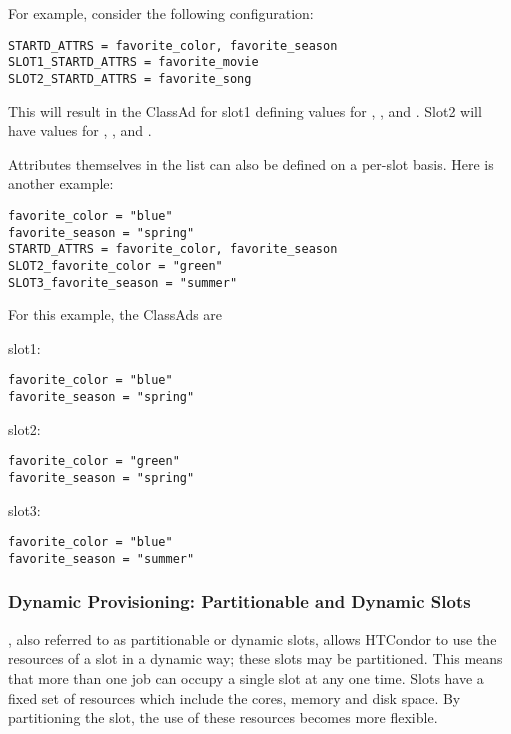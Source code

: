For example, consider the following configuration:
\begin{verbatim}
STARTD_ATTRS = favorite_color, favorite_season
SLOT1_STARTD_ATTRS = favorite_movie
SLOT2_STARTD_ATTRS = favorite_song
\end{verbatim}

This will result in the  ClassAd for
slot1 defining values for
, ,
and .
Slot2 will have values for
, , and .

Attributes themselves in the  list
can also be defined on a per-slot basis.
Here is another example:

\begin{verbatim}
favorite_color = "blue"
favorite_season = "spring"
STARTD_ATTRS = favorite_color, favorite_season
SLOT2_favorite_color = "green"
SLOT3_favorite_season = "summer"
\end{verbatim}

For this example, the  ClassAds are
\begin{description}
\item{slot1}:
\begin{verbatim}
favorite_color = "blue"
favorite_season = "spring"
\end{verbatim}
\item{slot2}:
\begin{verbatim}
favorite_color = "green"
favorite_season = "spring"
\end{verbatim}
\item{slot3}:
\begin{verbatim}
favorite_color = "blue"
favorite_season = "summer"
\end{verbatim}
\end{description}

\subsubsection{\label{sec:SMP-dynamicprovisioning}
Dynamic Provisioning: Partitionable and Dynamic Slots}

,
also referred to as partitionable or dynamic slots,
allows HTCondor to use the resources of a slot in a dynamic way;
these slots may be partitioned. 
This means that more than one job can occupy a single slot at any one time. 
Slots have a fixed set of resources which
include the cores, memory and disk space. 
By partitioning the slot, 
the use of these resources becomes more flexible.

